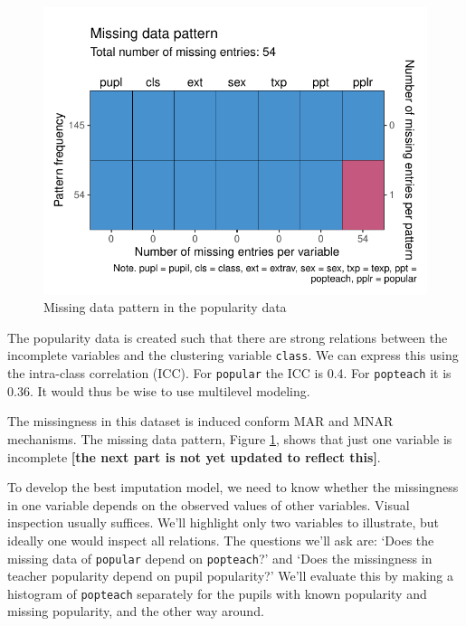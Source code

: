 \documentclass[
]{jss}
\begin{document}
\begin{CodeChunk}
\begin{figure}

{\centering \includegraphics{Manuscript_files/figure-latex/pop_pat-1} 

}

\caption[Missing data pattern in the popularity data]{Missing data pattern in the popularity data}\label{fig:pop_pat}
\end{figure}
\end{CodeChunk}

The popularity data is created such that there are strong relations
between the incomplete variables and the clustering variable
\texttt{class}. We can express this using the intra-class correlation
(ICC). For \texttt{popular} the ICC is 0.4. For \texttt{popteach} it is
0.36. It would thus be wise to use multilevel modeling.

The missingness in this dataset is induced conform MAR and MNAR
mechanisms. The missing data pattern, Figure \ref{fig:pop_pat}, shows
that just one variable is incomplete \textbf{{[}the next part is not yet
updated to reflect this{]}}.

To develop the best imputation model, we need to know whether the
missingness in one variable depends on the observed values of other
variables. Visual inspection usually suffices. We'll highlight only two
variables to illustrate, but ideally one would inspect all relations.
The questions we'll ask are: `Does the missing data of \texttt{popular}
depend on \texttt{popteach}?' and `Does the missingness in teacher
popularity depend on pupil popularity?' We'll evaluate this by making a
histogram of \texttt{popteach} separately for the pupils with known
popularity and missing popularity, and the other way around.
\end{document}
